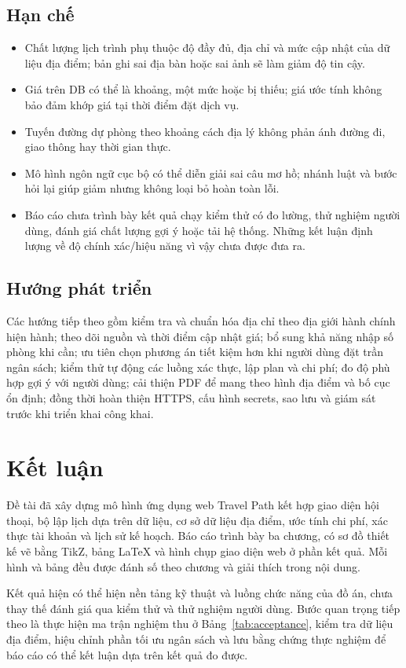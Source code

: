 \documentclass[12pt,a4paper,oneside]{report}
\begin{document}
\subsection{Hạn chế}
\begin{itemize}
  \item Chất lượng lịch trình phụ thuộc độ đầy đủ, địa chỉ và mức cập nhật của dữ liệu địa điểm; bản ghi sai địa bàn hoặc sai ảnh sẽ làm giảm độ tin cậy.
  \item Giá trên DB có thể là khoảng, một mức hoặc bị thiếu; giá ước tính không bảo đảm khớp giá tại thời điểm đặt dịch vụ.
  \item Tuyến đường dự phòng theo khoảng cách địa lý không phản ánh đường đi, giao thông hay thời gian thực.
  \item Mô hình ngôn ngữ cục bộ có thể diễn giải sai câu mơ hồ; nhánh luật và bước hỏi lại giúp giảm nhưng không loại bỏ hoàn toàn lỗi.
  \item Báo cáo chưa trình bày kết quả chạy kiểm thử có đo lường, thử nghiệm người dùng, đánh giá chất lượng gợi ý hoặc tải hệ thống. Những kết luận định lượng về độ chính xác/hiệu năng vì vậy chưa được đưa ra.
\end{itemize}

\subsection{Hướng phát triển}
Các hướng tiếp theo gồm kiểm tra và chuẩn hóa địa chỉ theo địa giới hành chính hiện hành; theo dõi nguồn và thời điểm cập nhật giá; bổ sung khả năng nhập số phòng khi cần; ưu tiên chọn phương án tiết kiệm hơn khi người dùng đặt trần ngân sách; kiểm thử tự động các luồng xác thực, lập plan và chi phí; đo độ phù hợp gợi ý với người dùng; cải thiện PDF để mang theo hình địa điểm và bố cục ổn định; đồng thời hoàn thiện HTTPS, cấu hình secrets, sao lưu và giám sát trước khi triển khai công khai.

\section{Kết luận}
Đề tài đã xây dựng mô hình ứng dụng web Travel Path kết hợp giao diện hội thoại, bộ lập lịch dựa trên dữ liệu, cơ sở dữ liệu địa điểm, ước tính chi phí, xác thực tài khoản và lịch sử kế hoạch. Báo cáo trình bày ba chương, có sơ đồ thiết kế vẽ bằng TikZ, bảng LaTeX và hình chụp giao diện web ở phần kết quả. Mỗi hình và bảng đều được đánh số theo chương và giải thích trong nội dung.

Kết quả hiện có thể hiện nền tảng kỹ thuật và luồng chức năng của đồ án, chưa thay thế đánh giá qua kiểm thử và thử nghiệm người dùng. Bước quan trọng tiếp theo là thực hiện ma trận nghiệm thu ở Bảng~\ref{tab:acceptance}, kiểm tra dữ liệu địa điểm, hiệu chỉnh phần tối ưu ngân sách và lưu bằng chứng thực nghiệm để báo cáo có thể kết luận dựa trên kết quả đo được.
\end{document}
